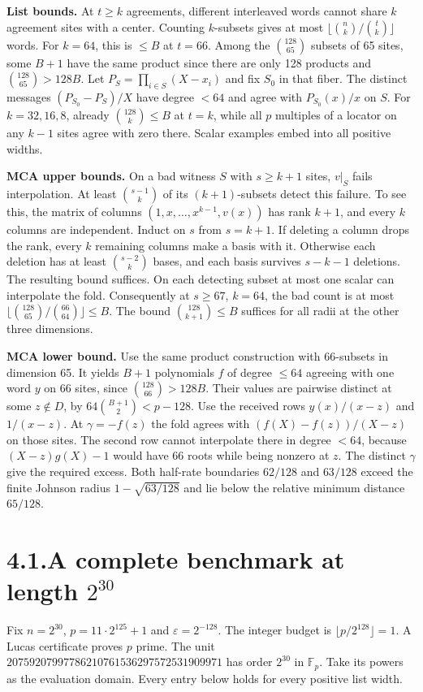 \documentclass[11pt,letterpaper]{article}
\begin{document}
\textbf{List bounds.} At $t\ge k$ agreements, different interleaved words cannot share $k$ agreement sites with a center. Counting $k$-subsets gives at most $\lfloor\binom nk/\binom tk\rfloor$ words. For $k=64$, this is $\le B$ at $t=66$. Among the $\binom{128}{65}$ subsets of 65 sites, some $B+1$ have the same product since there are only 128 products and $\binom{128}{65}>128B$. Let $P_S=\prod_{i\in S}(X-x_i)$ and fix $S_0$ in that fiber. The distinct messages $(P_{S_0}-P_S)/X$ have degree $<64$ and agree with $P_{S_0}(x)/x$ on $S$. For $k=32,16,8$, already $\binom{128}{k}\le B$ at $t=k$, while all $p$ multiples of a locator on any $k-1$ sites agree with zero there. Scalar examples embed into all positive widths.

\textbf{MCA upper bounds.} On a bad witness $S$ with $s\ge k+1$ sites, $v|_S$ fails interpolation. At least $\binom{s-1}{k}$ of its $(k+1)$-subsets detect this failure. To see this, the matrix of columns $(1,x,\ldots,x^{k-1},v(x))$ has rank $k+1$, and every $k$ columns are independent. Induct on $s$ from $s=k+1$. If deleting a column drops the rank, every $k$ remaining columns make a basis with it. Otherwise each deletion has at least $\binom{s-2}k$ bases, and each basis survives $s-k-1$ deletions. The resulting bound suffices. On each detecting subset at most one scalar can interpolate the fold. Consequently at $s\ge67$, $k=64$, the bad count is at most $\lfloor\binom{128}{65}/\binom{66}{64}\rfloor\le B$. The bound $\binom{128}{k+1}\le B$ suffices for all radii at the other three dimensions.

\textbf{MCA lower bound.} Use the same product construction with 66-subsets in dimension 65. It yields $B+1$ polynomials $f$ of degree $\le64$ agreeing with one word $y$ on 66 sites, since $\binom{128}{66}>128B$. Their values are pairwise distinct at some $z\notin D$, by $64\binom{B+1}2<p-128$. Use the received rows $y(x)/(x-z)$ and $1/(x-z)$. At $\gamma=-f(z)$ the fold agrees with $(f(X)-f(z))/(X-z)$ on those sites. The second row cannot interpolate there in degree $<64$, because $(X-z)g(X)-1$ would have 66 roots while being nonzero at $z$. The distinct $\gamma$ give the required excess. Both half-rate boundaries $62/128$ and $63/128$ exceed the finite Johnson radius $1-\sqrt{63/128}$ and lie below the relative minimum distance $65/128$.

\newpage
\section*{4.1.\quad A complete benchmark at length $2^{30}$}
Fix $n=2^{30}$, $p=11\cdot2^{125}+1$ and $\varepsilon=2^{-128}$. The integer budget is
$\lfloor p/2^{128}\rfloor=1$. A Lucas certificate proves $p$ prime. The unit
$20759207997786210761536297572531909971$ has order $2^{30}$ in $\mathbb F_p$.
Take its powers as the evaluation domain. Every entry below holds for every positive list width.
\end{document}
